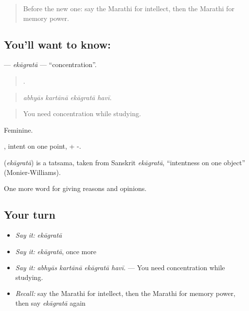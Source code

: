 \label{lesson:MR-C375-ekagrata}



\begin{quote}
Before the new one: say the Marathi for intellect, then the Marathi for memory power.
\end{quote}

\subsection*{You'll want to know: }
\textbf{} — \emph{ekāgratā} — \textquotedblleft{}concentration\textquotedblright{}.

\begin{quote}
   .
\end{quote}

\begin{quote}
\emph{abhyās kartānā ekāgratā havī.}
\end{quote}

\begin{quote}
You need concentration while studying.
\end{quote}

Feminine.

, intent on one point, + -.

\begin{cousinweb}
\textbf{} (\emph{ekāgratā}) is a tatsama, taken from Sanskrit \emph{ekāgratā}, \textquotedblleft{}intentness on one object\textquotedblright{} (Monier-Williams).
\end{cousinweb}

\begin{grammarlens}[title={What you've built}]
One more word for giving reasons and opinions.
\end{grammarlens}

\subsection*{Your turn}
\begin{itemize}
\raggedright
  \item \emph{Say it:} \emph{ekāgratā}
  \item \emph{Say it:} \emph{ekāgratā}, once more
  \item \emph{Say it:} \emph{abhyās kartānā ekāgratā havī.} — You need concentration while studying.
  \item \emph{Recall:} say the Marathi for intellect, then the Marathi for memory power, then say \emph{ekāgratā} again
\end{itemize}

